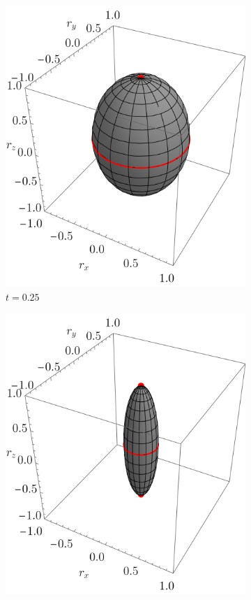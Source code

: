 \begin{figure}[ht!]
\begin{subfigure}{0.32\textwidth}
      \includegraphics[width=0.9\linewidth]{chapter3/figures_separable/szxId_t=0.25_p=0.6_r=0.9.png}
      \caption{$t=0.25$}
    \end{subfigure}
    \begin{subfigure}{0.32\textwidth}
      \centering
      \includegraphics[width=0.9\linewidth]{chapter3/figures_separable/szxId_t=0.5_p=0.6_r=0.9.png}

\end{subfigure}
\end{figure}
